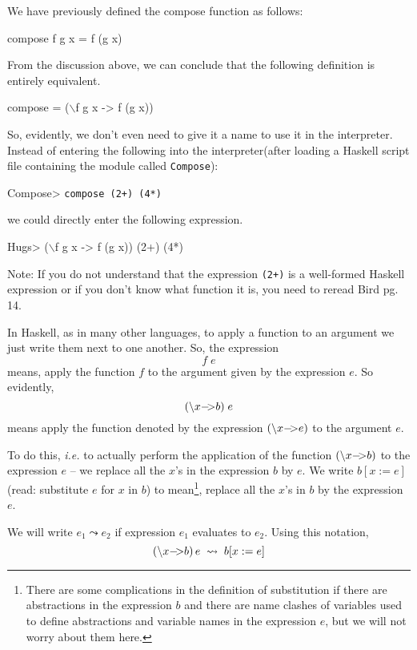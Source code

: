 \documentclass[11pt]{article}
\begin{document}
\begin{example}
We have previously defined the compose function as follows:
\begin{program*}
\> compose f g x = f (g x)
\end{program*}
From the discussion above, we can conclude that the following definition is
entirely equivalent.
\begin{program*}
\> compose = ($\backslash$f g x -> f (g x))
\end{program*}
So, evidently, we don't even need to give it a name to use it in the
interpreter.  Instead of entering the following into the interpreter(after
loading a Haskell script file containing the module called {\tt{Compose}}):
\begin{program*}
\> Compose> {\tt{compose (2+) (4*)}}
\end{program*}
we could directly enter the following expression.
\begin{program*}
\> Hugs> ($\backslash$f g x -> f (g x)) (2+) (4*)
\end{program*}
Note: If you do not understand that the expression {\tt{(2+)}} is a well-formed
Haskell expression or if you don't know what function it is, you need to reread
Bird pg. 14.

\end{example}


\smallsection

In Haskell, as in many other languages, to apply a function to an argument we
just write them next to one another.  So, the expression
\[f \; e\] means, apply the function
$f$ to the argument given by the expression $e$.  So evidently,
\[(\backslash{}x {\tt{-\!\!\!>}} b) \; e\] 
means apply the function denoted by the expression $(\backslash{}x {\tt{-\!\!\!>}} e)$
to the argument $e$.



To do this, {\em{i.e.}} to actually perform the application of the function
$(\backslash{}x {\tt{-\!\!\!>}} b)$ to the expression $e$ -- we replace all the $x$'s
in the expression $b$ by $e$.  We write $b[x:=e]$ (read: substitute $e$ for $x$
in $b$) to mean\footnote{ There are some complications in the definition of
substitution if there are abstractions in the expression $b$ and there are name
clashes of variables used to define abstractions and variable names in the
expression $e$, but we will not worry about them here.}, replace all the $x$'s
in $b$ by the expression $e$.

We will write $e_1 \leadsto e_2$ if expression $e_1$ evaluates to $e_2$.  Using this notation,
\[(\backslash{}x {\tt{-\!\!\!>}} b) \, e \;\leadsto \;  b[x:=e] \]
\end{document}
